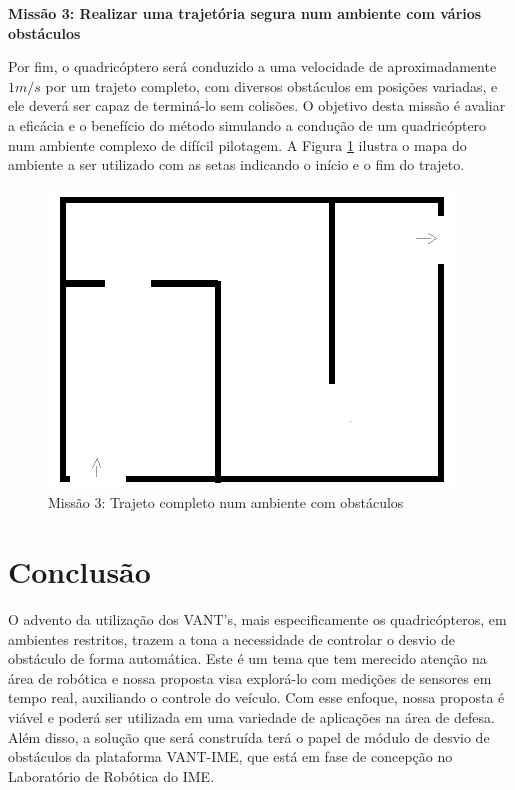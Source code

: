 \documentclass[a4paper, 12pt]{article}
\begin{document}
 \noindent\textbf{Missão 3: Realizar uma trajetória segura num ambiente com vários obstáculos} 
  
 Por fim, o quadricóptero será conduzido a uma velocidade de aproximadamente $1m/s$ por um trajeto completo, com diversos obstáculos em posições variadas, e ele deverá ser capaz de terminá-lo sem colisões. O objetivo desta missão é avaliar a eficácia e o benefício do método simulando a condução de um quadricóptero num ambiente complexo de difícil pilotagem. A Figura \ref{fig:missao3} ilustra o mapa do ambiente a ser utilizado com as setas indicando o início e o fim do trajeto.
  
  
 \begin{figure}[h]
 	\centering
 	\includegraphics[scale=0.4]{img/missao3.png}
 	\caption{Missão 3: Trajeto completo num ambiente com obstáculos}
 	\label{fig:missao3}
 \end{figure}  
  
\newpage

\section{Conclusão}
\label{sec:conclusao}

O advento da utilização dos VANT's, mais especificamente os quadricópteros, em ambientes restritos, trazem a tona a necessidade de controlar o desvio de obstáculo de forma automática. Este é um tema que tem merecido atenção na área de robótica e nossa proposta visa explorá-lo com medições de sensores em tempo real, auxiliando o controle do veículo. Com esse enfoque, nossa proposta é viável e poderá ser utilizada em uma variedade de aplicações na área de defesa.  Além disso, a solução que será construída terá o papel de módulo de desvio de obstáculos da plataforma VANT-IME, que está em fase de concepção no Laboratório de Robótica do IME.
\end{document}
